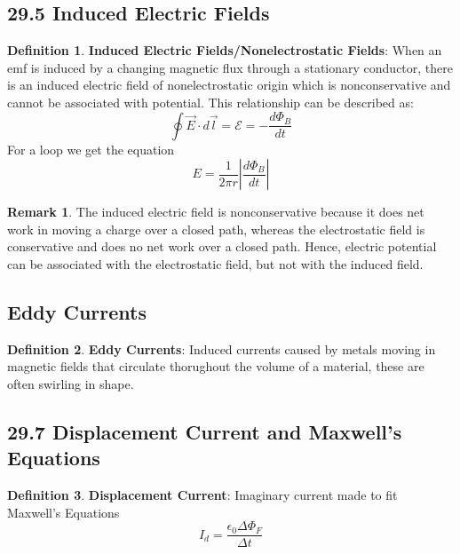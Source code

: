 \documentclass[12pt]{amsart}
\theoremstyle{definition}
\newtheorem{definition}{Definition} %
\newtheorem*{remark}{Remark}        %
\numberwithin{equation}{theorem}    %
\begin{document}
\subsection*{29.5 Induced Electric Fields}
\begin{definition}
    \textbf{Induced Electric Fields/Nonelectrostatic Fields}:
    When an emf is induced by a changing magnetic flux through a stationary conductor, there is an induced electric field of nonelectrostatic origin which is nonconservative and cannot be associated with potential. This relationship can be described as: 
    $$\oint \vec{E} \cdot d\vec{l} = \mathcal{E} = -\frac{d\Phi_B}{dt}$$
    For a loop we get the equation $$E = \frac{1}{2\pi r}{|\frac{d\Phi_B}{dt}|}$$

    \begin{remark}
        The induced electric field is nonconservative because it does net work in moving a charge over a closed path, whereas the electrostatic field is conservative and does no net work over a closed path. Hence, electric potential can be associated with the electrostatic field, but not with the induced field.
    \end{remark}
\end{definition}

\subsection*{Eddy Currents}

\begin{definition}
    \textbf{Eddy Currents}:
    Induced currents caused by metals moving in magnetic fields that circulate thorughout the volume of a material, these are often swirling in shape. 
\end{definition}

\subsection*{29.7 Displacement Current and Maxwell's Equations}

\begin{definition}
    \textbf{Displacement Current}:
    Imaginary current made to fit Maxwell's Equations
    $$I_d = \frac{\epsilon_0 \Delta \Phi_F}{\Delta t}$$
\end{definition}
\end{document}
